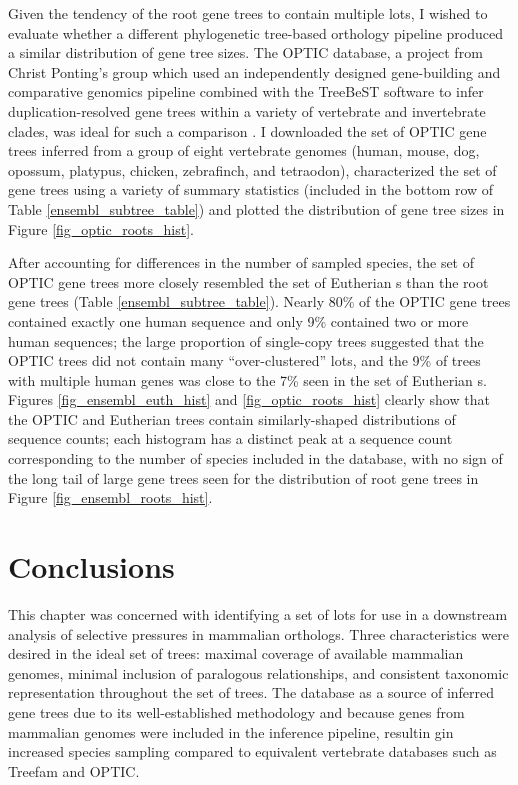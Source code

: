 Given the tendency of the root \cmp gene trees to contain multiple
\mammln \acp{lot}, I wished to evaluate whether a different
phylogenetic tree-based orthology pipeline produced a similar
distribution of gene tree sizes. The OPTIC database, a project from
Christ Ponting's group which used an independently designed
gene-building and comparative genomics pipeline combined with the
TreeBeST software to infer duplication-resolved gene trees within a
variety of vertebrate and invertebrate clades, was ideal for such a
comparison \citep{Heger2008}. I downloaded the set of OPTIC gene trees
inferred from a group of eight vertebrate genomes (human, mouse, dog,
opossum, platypus, chicken, zebrafinch, and tetraodon), characterized
the set of gene trees using a variety of summary statistics (included
in the bottom row of Table \ref{ensembl_subtree_table}) and plotted the
distribution of gene tree sizes in Figure \ref{fig_optic_roots_hist}.

After accounting for differences in the number of sampled species, the
set of OPTIC gene trees more closely resembled the set of Eutherian
\subtr{}s than the root \cmp gene trees (Table
\ref{ensembl_subtree_table}). Nearly 80\% of the OPTIC gene trees
contained exactly one human sequence and only 9\% contained two or
more human sequences; the large proportion of single-copy trees
suggested that the OPTIC trees did not contain many ``over-clustered''
\mammln \acp{lot}, and the 9\% of trees with multiple human genes was
close to the 7\% seen in the set of Eutherian \subtr{}s. Figures
\ref{fig_ensembl_euth_hist} and \ref{fig_optic_roots_hist} clearly show that
the OPTIC and Eutherian trees contain similarly-shaped distributions
of sequence counts; each histogram has a distinct peak at a sequence
count corresponding to the number of species included in the database,
with no sign of the long tail of large gene trees seen for the
distribution of root \cmp gene trees in Figure
\ref{fig_ensembl_roots_hist}.

\section{Conclusions}

This chapter was concerned with identifying a set of \acfp{lot} for use
in a downstream analysis of \sw selective pressures in mammalian
orthologs. Three characteristics were desired in the ideal set of
trees: maximal coverage of available mammalian genomes, minimal
inclusion of paralogous relationships, and consistent taxonomic
representation throughout the set of trees. The \ens \cmp database as
a source of inferred gene trees due to its well-established
methodology \citep{Heger2008,Vilella2009} and because genes from \lcv
mammalian genomes were included in the inference pipeline, resultin
gin increased species sampling compared to equivalent vertebrate
databases such as Treefam and OPTIC.

